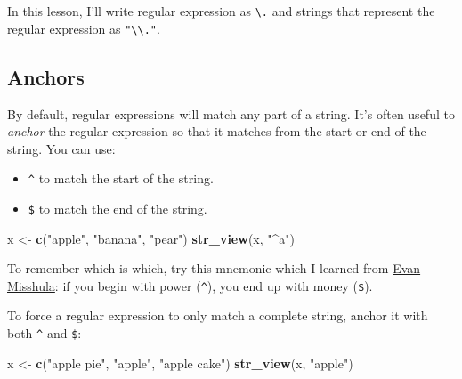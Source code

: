 \documentclass[]{book}
\newenvironment{Shaded}{\begin{snugshade}}{\end{snugshade}}
\newcommand{\KeywordTok}[1]{\textcolor[rgb]{0.13,0.29,0.53}{\textbf{#1}}}
\newcommand{\StringTok}[1]{\textcolor[rgb]{0.31,0.60,0.02}{#1}}
\newcommand{\NormalTok}[1]{#1}
\providecommand{\tightlist}{%
  \setlength{\itemsep}{0pt}\setlength{\parskip}{0pt}}
\begin{document}
In this lesson, I'll write regular expression as
\texttt{\textbackslash{}.} and strings that represent the regular
expression as \texttt{"\textbackslash{}\textbackslash{}."}.

\subsection{Anchors}\label{anchors}

By default, regular expressions will match any part of a string. It's
often useful to \emph{anchor} the regular expression so that it matches
from the start or end of the string. You can use:

\begin{itemize}
\tightlist
\item
  \texttt{\^{}} to match the start of the string.
\item
  \texttt{\$} to match the end of the string.
\end{itemize}

\begin{Shaded}
\begin{Highlighting}[]
\NormalTok{x <-}\StringTok{ }\KeywordTok{c}\NormalTok{(}\StringTok{"apple"}\NormalTok{, }\StringTok{"banana"}\NormalTok{, }\StringTok{"pear"}\NormalTok{)}
\KeywordTok{str_view}\NormalTok{(x, }\StringTok{"^a"}\NormalTok{)}
\end{Highlighting}
\end{Shaded}

\hypertarget{htmlwidget-aa15db13da1b7c3faf29}{}

\begin{Shaded}
\end{Shaded}

\hypertarget{htmlwidget-f3525ce3d319e7c562ff}{}

To remember which is which, try this mnemonic which I learned from
\href{https://twitter.com/emisshula/status/323863393167613953}{Evan
Misshula}: if you begin with power (\texttt{\^{}}), you end up with
money (\texttt{\$}).

To force a regular expression to only match a complete string, anchor it
with both \texttt{\^{}} and \texttt{\$}:

\begin{Shaded}
\begin{Highlighting}[]
\NormalTok{x <-}\StringTok{ }\KeywordTok{c}\NormalTok{(}\StringTok{"apple pie"}\NormalTok{, }\StringTok{"apple"}\NormalTok{, }\StringTok{"apple cake"}\NormalTok{)}
\KeywordTok{str_view}\NormalTok{(x, }\StringTok{"apple"}\NormalTok{)}
\end{Highlighting}
\end{Shaded}
\end{document}
